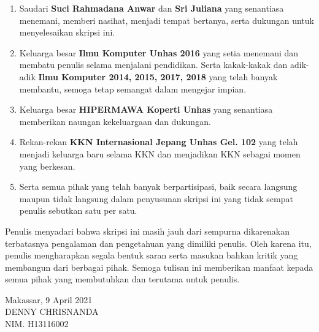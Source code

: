 \begin{enumerate}[topsep=0pt,itemsep=0pt,partopsep=0pt, parsep=0pt]
    \item Saudari \textbf{Suci Rahmadana Anwar} dan \textbf{Sri Juliana} yang senantiasa menemani, memberi nasihat, menjadi tempat bertanya, serta dukungan untuk menyelesaikan skripsi ini.

    \item Keluarga besar \textbf{Ilmu Komputer Unhas 2016} yang setia menemani dan membatu penulis selama menjalani pendidikan. Serta kakak-kakak dan adik-adik \textbf{Ilmu Komputer 2014, 2015, 2017, 2018} yang telah banyak membantu, semoga tetap semangat dalam mengejar impian.

    \item Keluarga besar \textbf{HIPERMAWA Koperti Unhas} yang senantiasa memberikan naungan kekeluargaan dan dukungan.

    \item Rekan-rekan \textbf{KKN Internasional Jepang Unhas Gel. 102} yang telah menjadi keluarga baru selama KKN dan menjadikan KKN sebagai momen yang berkesan.

    \item Serta semua pihak yang telah banyak berpartisipasi, baik secara langsung maupun tidak langsung dalam penyusunan skripsi ini yang tidak sempat penulis sebutkan satu per satu.
\end{enumerate}

Penulis menyadari bahwa skripsi ini masih jauh dari sempurna dikarenakan terbatasnya pengalaman dan pengetahuan yang dimiliki penulis. Oleh karena itu, penulis mengharapkan segala bentuk saran serta masukan bahkan kritik yang membangun dari berbagai pihak. Semoga tulisan ini memberikan manfaat kepada semua pihak yang membutuhkan dan terutama untuk penulis.

\vspace{1cm}
\begin{flushright}
    Makassar, 9 April 2021\\
    \vspace{2.5cm}
    {DENNY CHRISNANDA}\\
    NIM. {H13116002}
\end{flushright}

